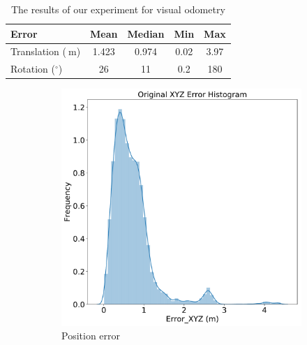 \documentclass{article}
\begin{document}
\begin{table}
  \centering
  \begin{tabular}{l | c | c | c | c }
    Error &  Mean & Median & Min & Max \\
    \hline
    Translation ($\SI{}{\meter}$) &  1.423 & 0.974 & 0.02 & 3.97 \\
    Rotation ($^\circ$)         &  26    & 11    & 0.2  & 180
  \end{tabular}
  \caption{The results of our experiment for visual odometry}
\end{table}


\begin{figure}[H]
  \centering
  \begin{subfigure}[b]{0.45\textwidth}
    \includegraphics[width=\textwidth]{../figures/origxyz.pdf}
    \caption{Position error}
  \end{subfigure}
  \begin{subfigure}[b]{0.45\textwidth}

\end{subfigure}
\end{figure}
\end{document}
